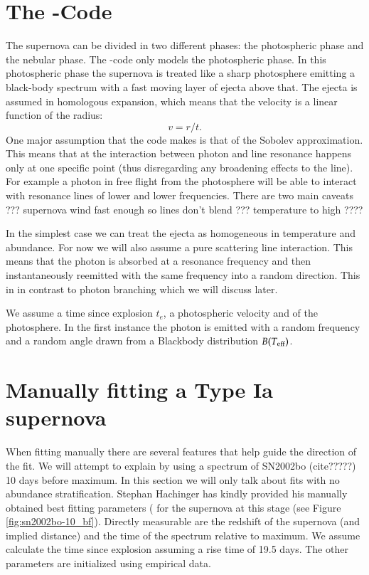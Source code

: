 \section{The \mlc-Code}

The supernova can be divided in two different phases: the photospheric phase and the nebular phase. The \mlc-code only models the photospheric phase.
In this photospheric phase the supernova is treated like a sharp photosphere emitting a black-body spectrum with a fast moving layer of ejecta above that. The ejecta is assumed in homologous expansion, which means that the velocity is a linear function of the radius:
\[
	v=  r / t.
\]
One major assumption that the code makes is that of the Sobolev approximation. This means that at the interaction between photon and line resonance happens only at one specific point (thus disregarding any broadening effects to the line). For example a photon in free flight from the photosphere will be able to interact with resonance lines of lower and lower frequencies. 
There are two main caveats ??? supernova wind fast enough so lines don't blend ??? temperature to high ????

In the simplest case we can treat the ejecta as homogeneous in temperature and abundance. For now we will also assume a pure scattering line interaction. This means that the photon is absorbed at a resonance frequency and then instantaneously reemitted with the same frequency into a random direction. This in in contrast to photon branching which we will discuss later. 

We assume a time since explosion $t_e$, a photospheric velocity \vph and \teff of the photosphere. 
In the first instance the photon is emitted with a random frequency and a random angle drawn from a Blackbody distribution $B(T_{\rm eff})$.  



\section{Manually fitting a Type Ia supernova}

When fitting manually there are several features that help guide the direction of the fit. We will attempt to explain by using a spectrum of SN2002bo (cite?????) 10 days before maximum. In this section we will only talk about fits with no abundance stratification. Stephan Hachinger has kindly provided his manually obtained best fitting parameters ( for the supernova at this stage (see Figure \ref{fig:sn2002bo-10_bf}).
Directly measurable are the redshift of the supernova (and implied distance) and the time of the spectrum relative to maximum. We assume calculate the time since explosion assuming a rise time of 19.5 days.
The other parameters are initialized using empirical data. 

